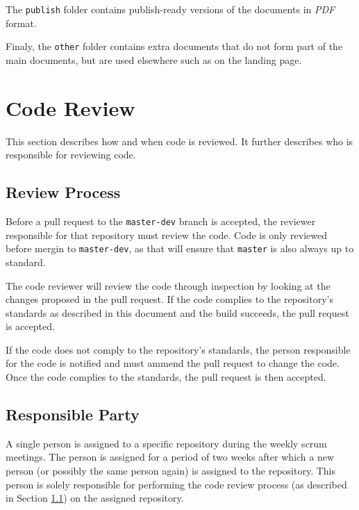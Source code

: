 \documentclass{article}
\begin{document}
    The \texttt{publish} folder contains publish-ready versions of the documents
    in \textit{PDF} format.

    Finaly, the \texttt{other} folder contains extra documents that do not form
    part of the main documents, but are used elsewhere such as on the landing
    page.

    \newpage


    \section{Code Review}
    \label{sec:review}

    This section describes how and when code is reviewed. It further describes
    who is responsible for reviewing code.

    \subsection{Review Process}
    \label{sec:review-proc}

    Before a pull request to the \texttt{master-dev} branch is accepted, the
    reviewer responsible for that repository must review the code. Code is
    only reviewed before mergin to \texttt{master-dev}, as that will ensure
    that \texttt{master} is also always up to standard.

    The code reviewer will review the code through inspection by looking at the
    changes proposed in the pull request. If the code complies to the
    repository's standards as described in this document and the build succeeds,
    the pull request is accepted.

    If the code does not comply to the repository's standards, the person
    responsible for the code is notified and must ammend the pull request to
    change the code. Once the code complies to the standards, the pull
    request is then accepted.

    \subsection{Responsible Party}
    \label{sec:review-party}

    A single person is assigned to a specific repository during the weekly scrum
    meetings. The person is assigned for a period of two weeks after which a new
    person (or possibly the same person again) is assigned to the repository.
    This person is solely responsible for performing the code review process (as
    described in Section \ref{sec:review-proc}) on the assigned repository.
\end{document}
